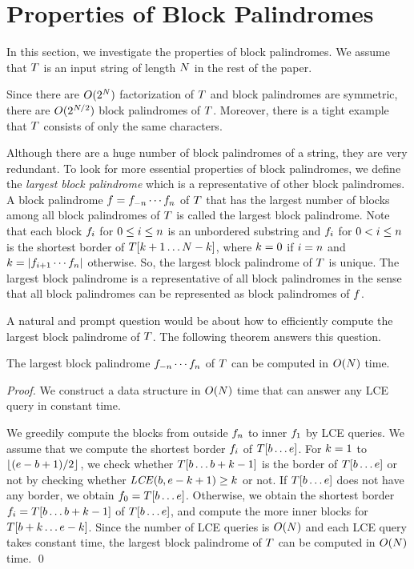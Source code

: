 \section{Properties of Block Palindromes}
In this section, we investigate the properties of block palindromes.
We assume that $T$ is an input string of length $N$ in the rest of the paper.

Since there are $O(2^N)$ factorization of $T$ and block palindromes are symmetric, there are $O(2^{N/2})$ block palindromes of $T$.
Moreover, there is a tight example that $T$ consists of only the same characters.

Although there are a huge number of block palindromes of a string, they are very redundant.
To look for more essential properties of block palindromes, we define
the \emph{largest block palindrome} which is a representative of other block palindromes.
A block palindrome $f=f_{-n} \cdots f_{n}$ of $T$ that has
the largest number of blocks among all block palindromes of $T$ is called the largest block palindrome.
Note that each block $f_i$ for $0 \leq i \leq n$ is an unbordered substring and $f_i$ for $0 < i \leq n$ is  the shortest border of $T[k + 1 \ldots N - k]$, where $k=0$ if $i=n$ and $k=|f_{i+1} \cdots f_n|$ otherwise.
So, the largest block palindrome of $T$ is unique.
The largest block palindrome is a representative of all block palindromes in the sense that all block palindromes can be represented as block palindromes of $f$.

A natural and prompt question would be about how to efficiently compute the largest block palindrome of $T$.
The following theorem answers this question.

\begin{theorem}\label{theorem:largest}
	The largest block palindrome $f_{-n} \cdots f_{n}$ of $T$ can be computed in $O(N)$ time.
\end{theorem}
\begin{proof}
	We construct a data structure in $O(N)$ time that can answer any LCE query in constant time.

	We greedily compute the blocks from outside $f_{n}$ to inner $f_{1}$ by LCE queries.
	We assume that we compute the shortest border $f_{i}$ of $T[b \ldots e]$.
	For $k=1$ to $\lfloor (e - b + 1)/2 \rfloor$, we check whether $T[b \ldots b + k - 1]$ is the border of $T[b \ldots e]$ or not by checking whether $\mathit{LCE}(b, e-k+1) \geq k$ or not.
	If $T[b \ldots e]$ does not have any border, we obtain $f_0 = T[b \ldots e]$.
	Otherwise, we obtain the shortest border $f_i=T[b \ldots b + k-1]$ of $T[b \ldots e]$, and compute the more inner blocks for $T[b + k \ldots e - k]$.
	Since the number of LCE queries is $O(N)$ and each LCE query takes constant time, the largest block palindrome of $T$ can be computed in $O(N)$ time.
\qed
\end{proof}

